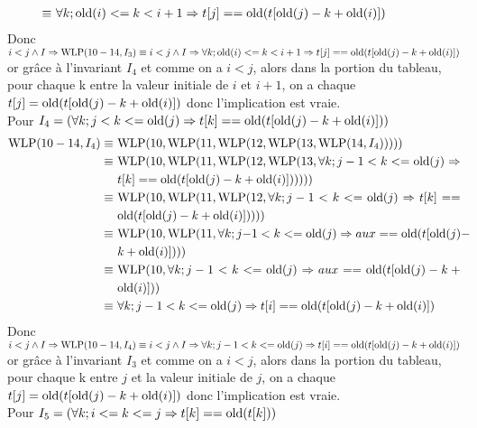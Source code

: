 \documentclass[11pt,answers]{exam}
\begin{document}
\begin{questions}
\begin{parts}
\begin{solutionorbox}
\begin{align*}
        \equiv               & ~\breaktowidth{10cm}{\forall k; \old(i) <= k < i+1 \Rightarrow t[j] == \old(t[\old(j)-k+\old(i)])}
      \end{align*}
      Donc $i < j \land I \Rightarrow \mathrm{WLP}(10-14,I_3)\\
      \equiv i < j \land I \Rightarrow \forall k; \mathrm{old}(i) <= k < i+1 \Rightarrow t[j] == \mathrm{old}(t[\mathrm{old}(j)-k+\mathrm{old}(i)])$\\
      or grâce à l'invariant $I_4$ et comme on a $i<j$, alors dans la portion du tableau, pour chaque k entre la valeur initiale de $i$ et $i+1$, on a
      chaque $t[j] = \mathrm{old}(t[\mathrm{old}(j)-k+\mathrm{old}(i)])$ donc l'implication est vraie.\\
      Pour $I_4 = (\forall k; j < k <= \mathrm{old}(j) \Rightarrow t[k] == \mathrm{old}(t[\mathrm{old}(j)-k+\mathrm{old}(i)]))$
      \begin{align*}
        \WLP(10-14,I_4) \equiv & ~\breaktowidth{10cm}{\WLP(10, \WLP(11, \WLP(12, \WLP(13, \WLP(14, I_4)))))}\\
        \equiv               & ~\breaktowidth{10cm}{\WLP(10, \WLP(11, \WLP(12, \WLP(13, \forall k; j-1 < k <= \old(j) \Rightarrow t[k] == \old(t[\old(j)-k+\old(i)])))))}\\
        \equiv               & ~\breaktowidth{10cm}{\WLP(10, \WLP(11, \WLP(12, \forall k; j-1 < k <= \old(j) \Rightarrow t[k] == \old(t[\old(j)-k+\old(i)]))))}\\
        \equiv               & ~\breaktowidth{10cm}{\WLP(10, \WLP(11, \forall k; j-1 < k <= \old(j) \Rightarrow aux == \old(t[\old(j)-k+\old(i)])))}\\
        \equiv               & ~\breaktowidth{10cm}{\WLP(10, \forall k; j-1 < k <= \old(j) \Rightarrow aux == \old(t[\old(j)-k+\old(i)]))}\\
        \equiv               & ~\breaktowidth{10cm}{\forall k; j-1 < k <= \old(j) \Rightarrow t[i] == \old(t[\old(j)-k+\old(i)])}
      \end{align*}
      Donc $i < j \land I \Rightarrow \mathrm{WLP}(10-14,I_4)\\
      \equiv i < j \land I \Rightarrow \forall k; j-1 < k <= \mathrm{old}(j) \Rightarrow t[i] == \mathrm{old}(t[\mathrm{old}(j)-k+\mathrm{old}(i)])$\\
      or grâce à l'invariant $I_3$ et comme on a $i<j$, alors dans la portion du tableau, pour chaque k entre $j$ et la valeur initiale de $j$, on a
      chaque $t[j] = \mathrm{old}(t[\mathrm{old}(j)-k+\mathrm{old}(i)])$ donc l'implication est vraie.\\
      Pour $I_5 = (\forall k; i <= k <= j \Rightarrow t[k] == \mathrm{old}(t[k]))$
      \begin{align*}

\end{align*}
\end{solutionorbox}
\end{parts}
\end{questions}
\end{document}

